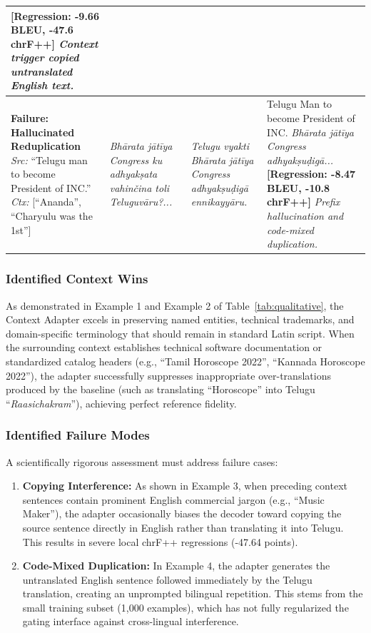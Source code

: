 \documentclass[conference]{IEEEtran}
\begin{document}
\begin{table}[t]
\begin{tabular}{p{}p{}p{}p{}}
\textbf{[Regression: -9.66 BLEU, -47.6 chrF++]}\newline
\textit{Context trigger copied untranslated English text.} \\
\midrule
\textbf{Failure: Hallucinated Reduplication}\newline
\textit{Src:} ``Telugu man to become President of INC.''\newline
\textit{Ctx:} [``Ananda'', ``Charyulu was the 1st''] &
\textit{Bh\=arata j\=at\=iya Congress ku adhyak\d{s}ata vahin\v{c}ina toli Teluguv\=aru?...} &
\textit{Telugu vyakti Bh\=arata j\=at\=iya Congress adhyak\d{s}u\d{d}ig\=a ennikayy\=aru.} &
Telugu Man to become President of INC. \textit{Bh\=arata j\=at\=iya Congress adhyak\d{s}u\d{d}ig\=a...}\newline
\textbf{[Regression: -8.47 BLEU, -10.8 chrF++]}\newline
\textit{Prefix hallucination and code-mixed duplication.} \\
\bottomrule
\end{tabular}
\end{table}

\subsubsection{Identified Context Wins}
As demonstrated in Example 1 and Example 2 of Table~\ref{tab:qualitative}, the Context Adapter excels in preserving named entities, technical trademarks, and domain-specific terminology that should remain in standard Latin script. When the surrounding context establishes technical software documentation or standardized catalog headers (e.g., ``Tamil Horoscope 2022'', ``Kannada Horoscope 2022''), the adapter successfully suppresses inappropriate over-translations produced by the baseline (such as translating ``Horoscope'' into Telugu ``\textit{Raasichakram}''), achieving perfect reference fidelity.

\subsubsection{Identified Failure Modes}
A scientifically rigorous assessment must address failure cases:
\begin{enumerate}
    \item \textbf{Copying Interference:} As shown in Example 3, when preceding context sentences contain prominent English commercial jargon (e.g., ``Music Maker''), the adapter occasionally biases the decoder toward copying the source sentence directly in English rather than translating it into Telugu. This results in severe local chrF++ regressions (-47.64 points).
    \item \textbf{Code-Mixed Duplication:} In Example 4, the adapter generates the untranslated English sentence followed immediately by the Telugu translation, creating an unprompted bilingual repetition. This stems from the small training subset (1,000 examples), which has not fully regularized the gating interface against cross-lingual interference.
\end{enumerate}
\end{document}
